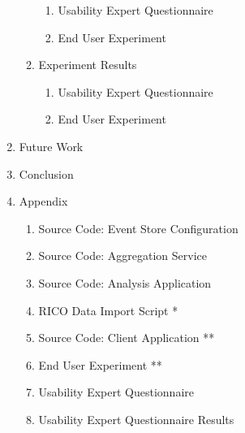 \begin{enumerate}[noitemsep,label=\arabic*.]
\begin{enumerate}[noitemsep,label=\arabic*.]
		\begin{enumerate}[noitemsep,label=\arabic*.]
		\item Usability Expert Questionnaire
		\item End User Experiment
		\end{enumerate}
	\item Experiment Results
		\begin{enumerate}[noitemsep,label=\arabic*.]
		\item Usability Expert Questionnaire
		\item End User Experiment
		\end{enumerate}	
	\end{enumerate}
\item Future Work
\item Conclusion
\item Appendix
	\begin{enumerate}[noitemsep,label=\arabic*.]
	\item Source Code: Event Store Configuration
	\item Source Code: Aggregation Service
	\item Source Code: Analysis Application
	\item RICO Data Import Script *
	\item Source Code: Client Application **
	\item End User Experiment **
	\item Usability Expert Questionnaire
	\item Usability Expert Questionnaire Results
	\end{enumerate}
\end{enumerate}
